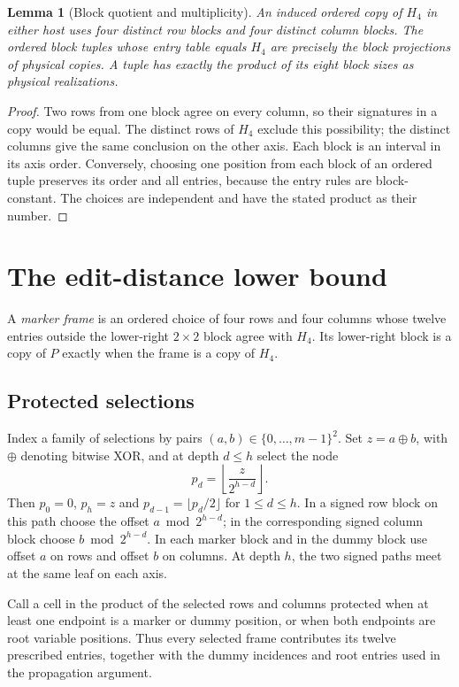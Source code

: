 \documentclass[11pt]{article}
\newtheorem{lemma}[theorem]{Lemma}
\begin{document}
\begin{lemma}[Block quotient and multiplicity]\label{lem:quotient}
An induced ordered copy of $H_4$ in either host uses four distinct row
blocks and four distinct column blocks. The ordered block tuples whose
entry table equals $H_4$ are precisely the block projections of physical
copies. A tuple has exactly the product of its eight block sizes as
physical realizations.
\end{lemma}
\begin{proof}
Two rows from one block agree on every column, so their signatures in a
copy would be equal. The distinct rows of $H_4$ exclude this possibility;
the distinct columns give the same conclusion on the other axis. Each
block is an interval in its axis order. Conversely, choosing one position
from each block of an ordered tuple preserves its order and all entries,
because the entry rules are block-constant. The choices are independent
and have the stated product as their number.
\end{proof}

\section{The edit-distance lower bound}\label{sec:distance}
A \emph{marker frame} is an ordered choice of four rows and four columns
whose twelve entries outside the lower-right $2\times2$ block agree with
$H_4$. Its lower-right block is a copy of $P$ exactly when the frame is a
copy of $H_4$.

\subsection{Protected selections}
Index a family of selections by pairs $(a,b)\in\{0,\ldots,m-1\}^2$.
Set $z=a\mathbin{\oplus}b$, with $\oplus$ denoting bitwise XOR, and at
depth $d\le h$ select the node
\[
 p_d=\left\lfloor\frac{z}{2^{h-d}}\right\rfloor.
\]
Then $p_0=0$, $p_h=z$ and $p_{d-1}=\lfloor p_d/2\rfloor$ for
$1\le d\le h$.
In a signed row block on this path choose the offset
$a\bmod2^{h-d}$; in the corresponding signed column block choose
$b\bmod2^{h-d}$. In each marker block and in the dummy block use offset
$a$ on rows and offset $b$ on columns. At depth $h$, the two signed paths
meet at the same leaf on each axis.

Call a cell in the product of the selected rows and columns protected
when at least one endpoint is a marker or dummy position, or when both
endpoints are root variable positions. Thus every
selected frame contributes its twelve prescribed entries, together with
the dummy incidences and root entries used in the propagation argument.
\end{document}
